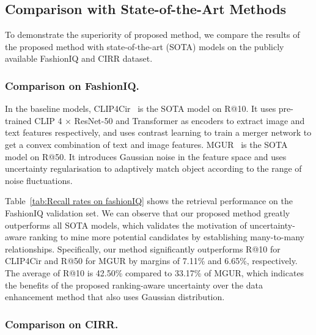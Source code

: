 \documentclass[letterpaper]{article} \usepackage{aaai24}  \usepackage{times}  \usepackage{helvet}  \usepackage{courier}  \usepackage[hyphens]{url}  \usepackage{graphicx} \urlstyle{rm} \def\UrlFont{\rm}  \usepackage{natbib}  \usepackage{caption} \frenchspacing  \setlength{\pdfpagewidth}{8.5in} \setlength{\pdfpageheight}{11in} \usepackage{amsmath,amsfonts}
\begin{document}
\subsection{Comparison with State-of-the-Art Methods}
To demonstrate the superiority of proposed method, we compare the results of the proposed method with state-of-the-art (SOTA) models on the publicly available FashionIQ and CIRR dataset. 

\subsubsection{Comparison on FashionIQ.}
In the baseline models, CLIP4Cir~\cite{Baldrati2022combiner} is the SOTA model on R@10. It uses pre-trained CLIP 4 $\times$ ResNet-50 and Transformer as encoders to extract image and text features respectively, and uses contrast learning to train a merger network to get a convex combination of text and image features. MGUR~\cite{chen2022composed} is the SOTA model on R@50. It introduces Gaussian noise in the feature space and uses uncertainty regularisation to adaptively match object according to the range of noise fluctuations. 

Table~\ref{tab:Recall rates on fashionIQ} shows the retrieval performance on the FashionIQ validation set. We can observe that our proposed method greatly outperforms all SOTA models, which validates the motivation of uncertainty-aware ranking to mine more potential candidates by establishing many-to-many relationships. Specifically, our method significantly outperforms R@10 for CLIP4Cir and R@50 for MGUR by margins of 7.11\% and 6.65\%, respectively. The average of R@10 is 42.50\% compared to 33.17\% of MGUR, which indicates the benefits of the proposed ranking-aware uncertainty over the data enhancement method that also uses Gaussian distribution. 


\subsubsection{Comparison on CIRR.}
\end{document}
